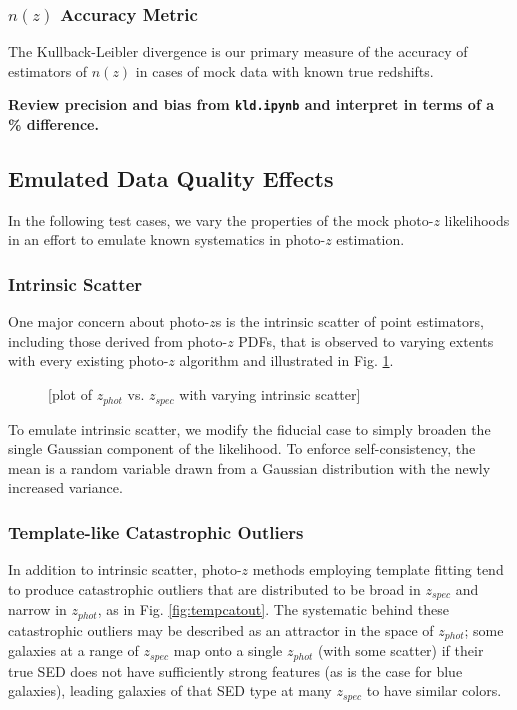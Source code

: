 \documentclass[iop]{emulateapj}
\begin{document}
\subsubsection{$n(z)$ Accuracy Metric}
\label{sec:accuracy}

The Kullback-Leibler divergence is our primary measure of the accuracy of 
estimators of $n(z)$ in cases of mock data with known true redshifts.

\textbf{Review precision and bias from \texttt{kld.ipynb} and interpret in 
terms of a \% difference.}

\subsection{Emulated Data Quality Effects}
\label{sec:likelihoods}

In the following test cases, we vary the properties of the mock photo-$z$ 
likelihoods in an effort to emulate known systematics in photo-$z$ estimation.

\subsubsection{Intrinsic Scatter}
\label{sec:intscat}

One major concern about photo-$z$s is the intrinsic scatter of point 
estimators, including those derived from photo-$z$ PDFs, that is observed to 
varying extents with every existing photo-$z$ algorithm and illustrated in Fig. 
\ref{fig:intscat}.  

\begin{figure}
	\begin{center}
		\caption{[plot of $z_{phot}$ vs. $z_{spec}$ with varying 
intrinsic scatter]}
		\label{fig:intscat}
	\end{center}
\end{figure}

To emulate intrinsic scatter, we modify the fiducial case to simply broaden the 
single Gaussian component of the likelihood.  To enforce self-consistency, the 
mean is a random variable drawn from a Gaussian distribution with the newly 
increased variance.

\subsubsection{Template-like Catastrophic Outliers}
\label{sec:tempcatout}

In addition to intrinsic scatter, photo-$z$ methods employing template fitting 
tend to produce catastrophic outliers that are distributed to be broad in 
$z_{spec}$ and narrow in $z_{phot}$, as in Fig. \ref{fig:tempcatout}.  The 
systematic behind these catastrophic outliers may be described as an attractor 
in the space of $z_{phot}$; some galaxies at a range of $z_{spec}$ map onto a 
single $z_{phot}$ (with some scatter) if their true SED does not have 
sufficiently strong features (as is the case for blue galaxies), leading 
galaxies of that SED type at many $z_{spec}$ to have similar colors.
\end{document}
